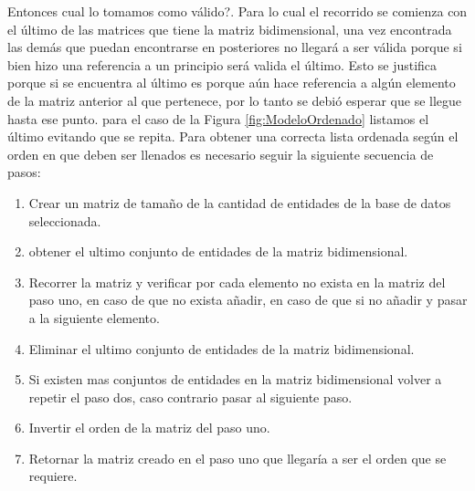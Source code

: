 Entonces cual lo tomamos como v\'alido?.
Para lo cual el  recorrido se comienza con el \'ultimo de las matrices que tiene la matriz bidimensional, una vez encontrada las dem\'as que puedan encontrarse en posteriores no llegar\'a a ser v\'alida porque si bien hizo una referencia a un principio ser\'a valida el \'ultimo. Esto se justifica porque si se encuentra al \'ultimo es porque a\'un hace referencia a alg\'un elemento de la matriz anterior al que pertenece, por lo tanto se debi\'o esperar que se llegue hasta ese punto. para el caso de la Figura \ref{fig:ModeloOrdenado} listamos el \'ultimo evitando que se repita.
Para obtener una correcta lista ordenada seg\'un el orden en que deben ser llenados es necesario seguir la siguiente secuencia de pasos:
\begin{enumerate}
\item Crear un matriz de tama\~no de la cantidad de entidades de la base de datos seleccionada.
\item obtener el ultimo conjunto de entidades de la matriz bidimensional.
\item Recorrer la matriz y verificar por cada elemento no exista en la matriz del paso uno, en caso de que no exista a\~nadir, en caso de que si no a\~nadir y pasar a la siguiente elemento.
\item Eliminar el ultimo conjunto de entidades de la matriz bidimensional.
\item Si existen mas conjuntos de entidades en la matriz bidimensional volver a repetir el paso dos, caso contrario pasar al siguiente paso.
\item Invertir el orden de la matriz del paso uno.
\item Retornar la matriz creado en el paso uno que llegar\'ia a ser el orden que se requiere.
\end{enumerate}
